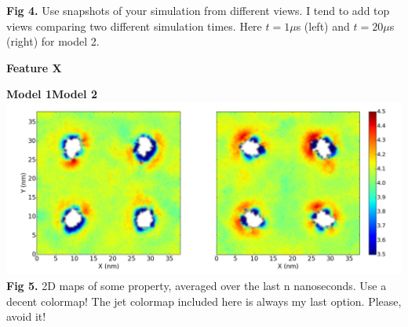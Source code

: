 \documentclass[a0,final,landscape]{a0poster}
\begin{document}
\begin{minipage}[c][-30cm]{0.3\textwidth}
\vspace{-1cm}
\begin{center}
\hspace{2cm}\small{\textbf{Fig 4.} Use snapshots of your simulation from different views. I tend to add top views comparing two different simulation times. Here $t=1\mu$s (left) and $t=20\mu$s (right) for model 2.}
\end{center}
\LARGE \textbf{Feature X}\\
\vspace{-2cm}
\begin{center}
\hspace{1cm}\Large\textcolor{vino}{\textbf{Model 1}}\hspace{8cm}\textcolor{vino}{\textbf{Model 2}}\\
\hspace{2cm}\includegraphics[scale=0.62]{img/thicks.png}\\ \hspace{2cm}
\small{\textbf{Fig 5.} 2D maps of some property, averaged over the last n nanoseconds. Use a decent colormap! The jet colormap included here is always my last option. Please, avoid it!}
\end{center}
\end{minipage}
\end{document}
